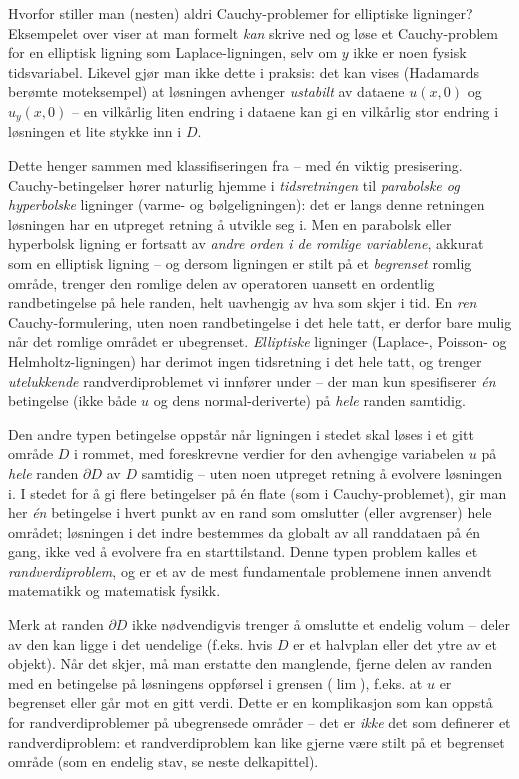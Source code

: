 \begin{rem}{Hvorfor stiller man (nesten) aldri Cauchy-problemer for elliptiske ligninger?}
Eksempelet over viser at man formelt \emph{kan} skrive ned og løse et Cauchy-problem for en elliptisk ligning som Laplace-ligningen, selv om $y$ ikke er noen fysisk tidsvariabel. Likevel gjør man ikke dette i praksis: det kan vises (Hadamards berømte moteksempel) at løsningen avhenger \emph{ustabilt} av dataene $u(x,0)$ og $u_y(x,0)$ -- en vilkårlig liten endring i dataene kan gi en vilkårlig stor endring i løsningen et lite stykke inn i $D$.

Dette henger sammen med klassifiseringen fra  -- med én viktig presisering. Cauchy-betingelser hører naturlig hjemme i \emph{tidsretningen} til \emph{parabolske og hyperbolske} ligninger (varme- og bølgeligningen): det er langs denne retningen løsningen har en utpreget retning å utvikle seg i. Men en parabolsk eller hyperbolsk ligning er fortsatt av \emph{andre orden i de romlige variablene}, akkurat som en elliptisk ligning -- og dersom ligningen er stilt på et \emph{begrenset} romlig område, trenger den romlige delen av operatoren uansett en ordentlig randbetingelse på hele randen, helt uavhengig av hva som skjer i tid. En \emph{ren} Cauchy-formulering, uten noen randbetingelse i det hele tatt, er derfor bare mulig når det romlige området er ubegrenset. \emph{Elliptiske} ligninger (Laplace-, Poisson- og Helmholtz-ligningen) har derimot ingen tidsretning i det hele tatt, og trenger \emph{utelukkende} randverdiproblemet vi innfører under -- der man kun spesifiserer \emph{én} betingelse (ikke både $u$ og dens normal-deriverte) på \emph{hele} randen samtidig.
\end{rem}

Den andre typen betingelse oppstår når ligningen i stedet skal løses i et gitt område \( D \) i rommet, med foreskrevne verdier for den avhengige variabelen \( u \) på \emph{hele} randen \( \partial D \) av \( D \) samtidig -- uten noen utpreget retning å evolvere løsningen i. I stedet for å gi flere betingelser på én flate (som i Cauchy-problemet), gir man her \emph{én} betingelse i hvert punkt av en rand som omslutter (eller avgrenser) hele området; løsningen i det indre bestemmes da globalt av all randdataen på én gang, ikke ved å evolvere fra en starttilstand. Denne typen problem kalles et \emph{randverdiproblem}, og er et av de mest fundamentale problemene innen anvendt matematikk og matematisk fysikk.

Merk at randen $\partial D$ ikke nødvendigvis trenger å omslutte et endelig volum -- deler av den kan ligge i det uendelige (f.eks. hvis $D$ er et halvplan eller det ytre av et objekt). Når det skjer, må man erstatte den manglende, fjerne delen av randen med en betingelse på løsningens oppførsel i grensen ($\lim$), f.eks. at $u$ er begrenset eller går mot en gitt verdi. Dette er en komplikasjon som kan oppstå for randverdiproblemer på ubegrensede områder -- det er \emph{ikke} det som definerer et randverdiproblem: et randverdiproblem kan like gjerne være stilt på et begrenset område (som en endelig stav, se neste delkapittel).


